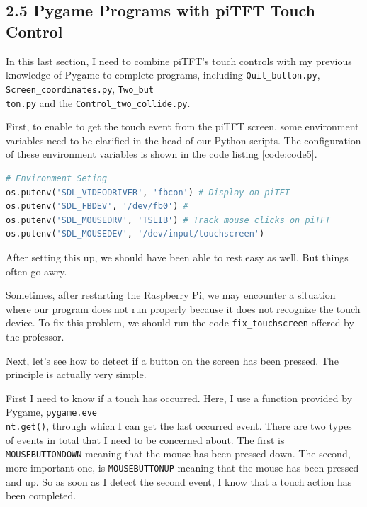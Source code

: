\documentclass[12pt]{report}
\newcommand{\code}[1]{\colorbox{light-gray}{\texttt{#1}}}
\begin{document}
\subsection*{2.5 Pygame Programs with piTFT Touch Control}\vspace{-1em}
In this last section, I need to combine piTFT's touch controls with my previous knowledge of Pygame to complete programs, including \code{Quit\_button.py}, \code{Screen\_coordinates.py}, \code{Two\_but}\\\code{ton.py} and the \code{Control\_two\_collide.py}.\par
First, to enable to get the touch event from the piTFT screen, some environment variables need to be clarified in the head of our Python scripts. The configuration of these environment variables is shown in the code listing \ref{code:code5}.
\begin{center}
\begin{lstlisting}[language=Python, caption=Environment variables settings, label=code:code5]
# Environment Seting
os.putenv('SDL_VIDEODRIVER', 'fbcon') # Display on piTFT
os.putenv('SDL_FBDEV', '/dev/fb0') #
os.putenv('SDL_MOUSEDRV', 'TSLIB') # Track mouse clicks on piTFT
os.putenv('SDL_MOUSEDEV', '/dev/input/touchscreen')
\end{lstlisting}
\end{center}\vspace{-2em}
After setting this up, we should have been able to rest easy as well. But things often go awry.\par
Sometimes, after restarting the Raspberry Pi, we may encounter a situation where our program does not run properly because it does not recognize the touch device. To fix this problem, we should run the code \code{fix\_touchscreen} offered by the professor.\par
Next, let's see how to detect if a button on the screen has been pressed. The principle is actually very simple.\par
First I need to know if a touch has occurred. Here, I use a function provided by Pygame, \code{pygame.eve}\\\code{nt.get()}, through which I can get the last occurred event. There are two types of events in total that I need to be concerned about. The first is \code{MOUSEBUTTONDOWN} meaning that the mouse has been pressed down. The second, more important one, is \code{MOUSEBUTTONUP} meaning that the mouse has been pressed and up. So as soon as I detect the second event, I know that a touch action has been completed.\par
\end{document}
